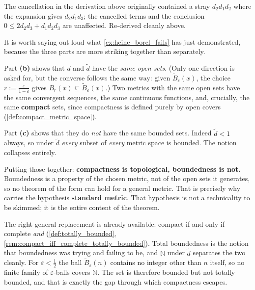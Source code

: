 \begin{ainote}
The cancellation in the derivation above originally contained a stray $d_2d_1d_2$ where the
expansion gives $d_2d_1d_3$; the cancelled terms and the conclusion $0 \leq 2d_2d_3 + d_1d_2d_3$
are unaffected. Re-derived cleanly above.
\end{ainote}

\begin{remark}
\label{rem:boundedness_not_topological}
It is worth saying out loud what \cref{ex:heine_borel_fails} has just demonstrated, because the
three parts are more striking together than separately.

Part \textbf{(b)} shows that $d$ and $\tilde d$ have the \emph{same open sets}. (Only one
direction is asked for, but the converse follows the same way: given
$\tilde B_\varepsilon(x)$, the choice $r := \tfrac{\varepsilon}{1-\varepsilon}$ gives
$B_r(x) \subseteq \tilde B_\varepsilon(x)$.) Two metrics with the same open sets have the same
convergent sequences, the same continuous functions, and, crucially, the same \textbf{compact}
sets, since compactness is defined purely by open covers (\cref{def:compact_metric_space}).

Part \textbf{(c)} shows that they do \emph{not} have the same bounded sets. Indeed
$\tilde d < 1$ always, so under $\tilde d$ \emph{every} subset of \emph{every} metric space is
bounded. The notion collapses entirely.

Putting those together: \textbf{compactness is topological, boundedness is not.} Boundedness is
a property of the chosen metric, not of the open sets it generates, so no theorem of the form
 can hold for a general metric. That is precisely why
 carries the hypothesis \textbf{standard metric}. That hypothesis is not a
technicality to be skimmed; it is the entire content of the theorem.

\begin{remark}
The right general replacement is already available: compact if and only if complete \emph{and}
 (\cref{def:totally_bounded},
\cref{rem:compact_iff_complete_totally_bounded}). Total boundedness is the notion that boundedness
was trying and failing to be, and $\mathbb{N}$ under $\tilde d$ separates the two cleanly. For
$\varepsilon < \tfrac12$ the ball $\tilde B_\varepsilon(n)$ contains no integer other than $n$
itself, so no finite family of $\varepsilon$-balls covers $\mathbb{N}$. The set is therefore
bounded but not totally bounded, and that is exactly the gap through which compactness escapes.
\end{remark}
\end{remark}

